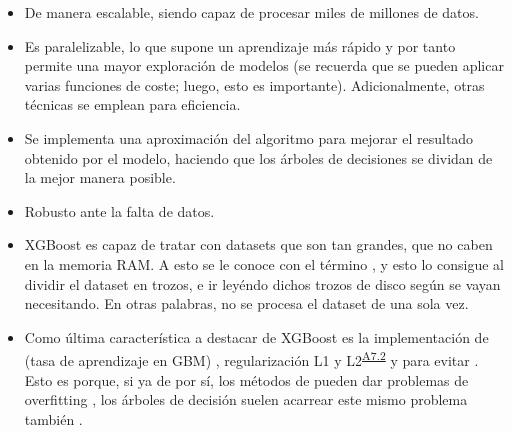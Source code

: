 \begin{itemize}
    \item De manera escalable, siendo capaz de procesar miles de millones de datos.
    \item Es paralelizable, lo que supone un aprendizaje más rápido y por tanto permite una mayor exploración de modelos (se recuerda que se pueden aplicar varias funciones de coste; luego, esto es importante). Adicionalmente, otras técnicas se emplean para eficiencia.
    \item Se implementa una aproximación del algoritmo  para mejorar el resultado obtenido por el modelo, haciendo que los árboles de decisiones se dividan de la mejor manera posible.
    \item Robusto ante la falta de datos.
    \item XGBoost es capaz de tratar con datasets que son tan grandes, que no caben en la memoria RAM.  A esto se le conoce con el término , y esto lo consigue al dividir el dataset en trozos, e ir leyéndo dichos trozos de disco según se vayan necesitando. En otras palabras, no se procesa el dataset de una sola vez.
    \item Como última característica a destacar de XGBoost es la implementación de  (tasa de aprendizaje en GBM) \parencite{GBM}, regularización L1 y L2\textsuperscript{\hyperref[ap:L1L2sec]{A7.2}} y   para evitar . Esto es porque, si ya de por sí, los métodos de  pueden dar problemas de overfitting \parencite{boostingOverfitting}, los árboles de decisión suelen acarrear este mismo problema también \parencite{CARToverfitting}.
\end{itemize}


